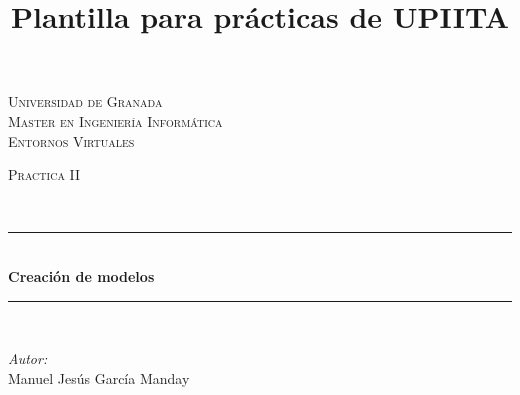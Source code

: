 \documentclass[10pt]{article}
\title{Plantilla para prácticas de UPIITA}
\begin{document}
\begin{center}																		%
\newcommand{\HRule}{\rule{\linewidth}{0.5mm}}									%
\begin{minipage}{0.48\textwidth} \begin{flushleft}
\end{flushleft}\end{minipage}
\begin{minipage}{0.48\textwidth} \begin{flushright}
\end{flushright}\end{minipage}

\vspace*{0.25cm}								%
\textsc{\huge Universidad de Granada}\\[1.5cm]	

\textsc{\LARGE Master en Ingeniería Informática}\\[1.5cm]													%

\textsc{\LARGE Entornos Virtuales}\\[1.5cm]													%

\begin{minipage}{0.9\textwidth} 
\begin{center}																					%
\textsc{\LARGE Practica II}
\end{center}
\end{minipage}\\[0.5cm]
 			\vspace*{1cm}																		%
\HRule \\[0.4cm]																	%
{ \huge \bfseries Creación de modelos}\\[0.4cm]	%
\HRule \\[1.5cm]																	%
\begin{minipage}{0.46\textwidth}													%
\begin{flushleft} \large															%
\emph{Autor:}\\	
 Manuel Jesús García Manday
\end{flushleft}																		%
\end{minipage}		
\begin{minipage}{0.52\textwidth}		
\vspace{-0.6cm}											%
\begin{flushright} \large															%
\end{flushright}																	%
\end{minipage}	
\vspace*{1cm}
 	

\end{center}
\end{document}
